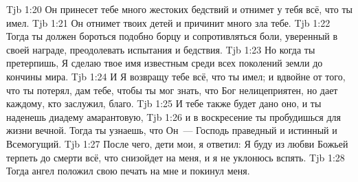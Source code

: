 \vs Tjb 1:20
Он принесет тебе много жестоких бедствий и отнимет у тебя всё, что ты имел.
\vs Tjb 1:21
Он отнимет твоих детей и причинит много зла тебе.
\vs Tjb 1:22
Тогда ты должен бороться подобно борцу и сопротивляться боли, уверенный в своей награде, преодолевать испытания и бедствия.
\vs Tjb 1:23
Но когда ты претерпишь, Я сделаю твое имя известным среди всех поколений земли до кончины мира.
\vs Tjb 1:24
И Я возвращу тебе всё, что ты имел; и вдвойне от того, что ты потерял, дам тебе, чтобы ты мог знать, что Бог нелицеприятен, но дает каждому, кто заслужил, благо.
\vs Tjb 1:25
И тебе также будет дано оно, и ты наденешь диадему амарантовую,
\vs Tjb 1:26
и в воскресение ты пробудишься для жизни вечной. Тогда ты узнаешь, что Он~--- Господь праведный и истинный и Всемогущий.
\vs Tjb 1:27
После чего, дети мои, я ответил: Я буду из любви Божьей терпеть до смерти всё, что снизойдет на меня, и я не уклонюсь вспять.
\vs Tjb 1:28
Тогда ангел положил свою печать на мне и покинул меня.

